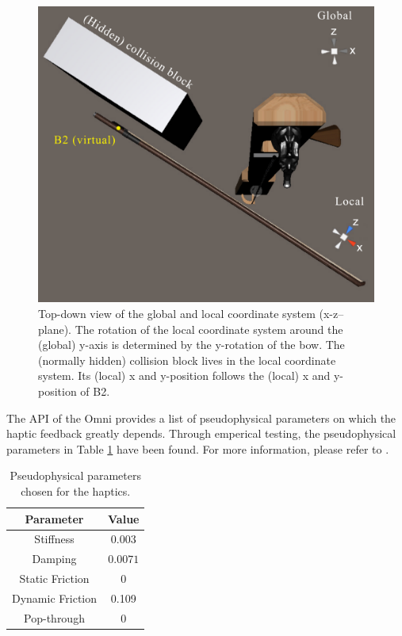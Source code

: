 \documentclass[dvipsnames, pdftex]{article}
\begin{document}
\begin{figure}[ht]\includegraphics[width=1.0\columnwidth]{SMC 2020 paper template LaTeX/figures/globalLocal.pdf}
\centering
  \caption{Top-down view of the global and local coordinate system (x-z--plane). The rotation of the local coordinate system around the (global) y-axis is determined by the y-rotation of the bow. The (normally hidden) collision block lives in the local coordinate system. Its (local) x and y-position follows the (local) x and y-position of B2. \label{fig:localGlobal}}
\end{figure}

The API of the Omni provides a list of pseudophysical parameters on which the haptic feedback greatly depends. Through emperical testing, the pseudophysical parameters in Table \ref{tab:pseudoParams} have been found. For more information, please refer to \cite{OmniAPI2018}. 
\begin{table}[h]
    \centering
    \begin{tabular}{|c|c|}
    \hline
        Parameter & Value \\\hline
        Stiffness & $0.003$ \\
        Damping & $0.0071$ \\
        Static Friction & 0 \\
        Dynamic Friction & 0.109 \\ 
        Pop-through & 0\\\hline
    \end{tabular}
    \caption{Pseudophysical parameters chosen for the haptics.}
    \label{tab:pseudoParams}
\end{table}
\end{document}
